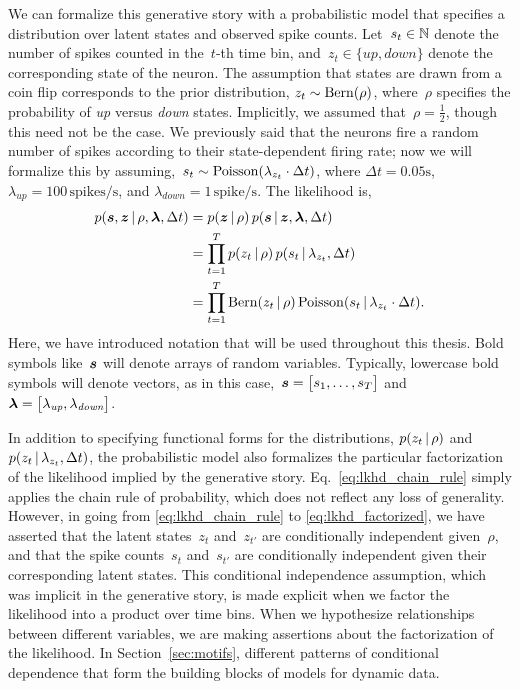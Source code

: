 \sloppy We can formalize this generative story with a probabilistic
model that specifies a distribution over latent states and
observed spike counts. Let~$s_t \in \mathbb{N}$ denote the number of
spikes counted in the~$t$-th time bin,
and~$z_t \in \{\textit{up}, \textit{down}\}$ denote the corresponding
state of the neuron. The assumption that states are drawn from a coin
flip corresponds to the prior distribution,
${z_t \sim \mathrm{Bern}(\rho)}$, where~$\rho$ specifies the
probability of \textit{up} versus \textit{down} states.  Implicitly,
we assumed that~${\rho=\tfrac{1}{2}}$, though this need not be the
case.  We previously said that the neurons fire a random number of
spikes according to their state-dependent firing rate; now we will
formalize this by
assuming,~${s_{t} \sim \mathrm{Poisson}(\lambda_{z_t} \cdot \Delta t)}$,
where ${\Delta t = 0.05\text{s}}$,
${\lambda_{\textit{up}} = 100\,\text{spikes/s}}$, and
${\lambda_{\textit{down}} = 1\,\text{spike/s}}$. 
The likelihood is,
\begin{align}
  \label{eq:lkhd_chain_rule}
  p(\boldsymbol{s}, \boldsymbol{z} \,|\, \rho, \boldsymbol{\lambda}, \Delta t) 
  &= p(\boldsymbol{z} \,|\, \rho) \, p(\boldsymbol{s} \,|\, \boldsymbol{z}, \boldsymbol{\lambda}, \Delta t) \\
  \label{eq:lkhd_factorized}
  &= \prod_{t=1}^T p(z_t \,|\, \rho) \, p(s_t \,|\, \lambda_{z_t}, \Delta t) \\
  &= \prod_{t=1}^T \mathrm{Bern}(z_t \,|\, \rho) \, \mathrm{Poisson}(s_t \,|\, \lambda_{z_t} \cdot \Delta t).
\end{align} 
Here, we have introduced notation that will be used throughout this
thesis. Bold symbols like~$\boldsymbol{s}$ will denote arrays of
random variables. Typically, lowercase bold symbols will denote
vectors, as in this case,~${\boldsymbol{s} = \big[s_1, \ldots, s_T \big]}$ 
and~${\boldsymbol{\lambda} = \big[ \lambda_{\textit{up}}, \lambda_{\textit{down}} \big]}$.

In addition to specifying functional forms for the distributions,
${p(z_t \,|\, \rho)}$ and~${p(z_t \,|\, \lambda_{z_t}, \Delta t)}$,
the probabilistic model also formalizes the particular factorization of
the likelihood implied by the generative story.
Eq.~\ref{eq:lkhd_chain_rule} simply applies the chain rule of
probability, which does not reflect any loss of generality. However,
in going from \eqref{eq:lkhd_chain_rule} to
\eqref{eq:lkhd_factorized}, we have asserted that the latent
states~$z_t$ and~$z_{t'}$ are conditionally independent given~$\rho$,
and that the spike counts~$s_{t}$ and~$s_{t'}$ are conditionally
independent given their corresponding latent states. This conditional
independence assumption, which was implicit in the generative story,
is made explicit when we factor the likelihood into a product
over time bins. When we hypothesize relationships between different variables,
we are making assertions about the factorization of the likelihood. 
In Section~\ref{sec:motifs}, different patterns of conditional dependence 
that form the building blocks of models for dynamic data.

